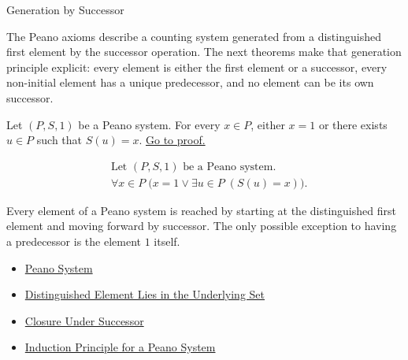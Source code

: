 \begin{topicbox}{Generation by Successor}
\begin{exposition}
The Peano axioms describe a counting system generated from a distinguished
first element by the successor operation. The next theorems make that
generation principle explicit: every element is either the first element or a
successor, every non-initial element has a unique predecessor, and no element
can be its own successor.
\end{exposition}

\begin{tcolorbox}[colback=thmbox, colframe=thmborder, arc=2pt,
  left=6pt, right=6pt, top=4pt, bottom=4pt,
  title={\small\textbf{Theorem (Every Element Is Either \texorpdfstring{$1$}{1} or a Successor)}} ,
  fonttitle=\small\bfseries]
\begin{theorem}
\label{thm:every-element-is-one-or-a-successor}
Let $(P,S,1)$ be a Peano system. For every $x \in P$, either $x=1$ or there
exists $u \in P$ such that $S(u)=x$.
\hyperref[prf-every-element-is-one-or-a-successor]{Go to proof.}
\end{theorem}
\end{tcolorbox}

\begin{remark*}
\[
\begin{aligned}
&\text{Let } (P,S,1) \text{ be a Peano system.}\\
&\forall x \in P\;\bigl(x=1 \lor \exists u \in P\;(S(u)=x)\bigr).
\end{aligned}
\]
\end{remark*}

\begin{remark*}[Interpretation]
Every element of a Peano system is reached by starting at the distinguished
first element and moving forward by successor. The only possible exception to
having a predecessor is the element $1$ itself.
\end{remark*}

\begin{remark*}[Dependencies]
\begin{itemize}
  \item \hyperref[def:peano-system]{Peano System}
  \item \hyperref[ax:peano-one-in-n]{Distinguished Element Lies in the Underlying Set}
  \item \hyperref[ax:peano-successor-closure]{Closure Under Successor}
  \item \hyperref[thm:induction-principle-for-peano-system]{Induction Principle for a Peano System}
\end{itemize}
\end{remark*}


\end{topicbox}
